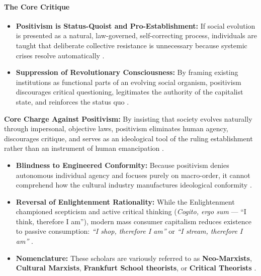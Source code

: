 \paragraph{The Core Critique}
\begin{itemize}
    \item \textbf{Positivism is Status-Quoist and Pro-Establishment:} If social evolution is presented as a natural, law-governed, self-correcting process, individuals are taught that deliberate collective resistance is unnecessary because systemic crises resolve automatically .
    \item \textbf{Suppression of Revolutionary Consciousness:} By framing existing institutions as functional parts of an evolving social organism, positivism discourages critical questioning, legitimates the authority of the capitalist state, and reinforces the status quo .
\end{itemize}

\begin{CriticalPoint}
\textbf{Core Charge Against Positivism:} By insisting that society evolves naturally through impersonal, objective laws, positivism eliminates human agency, discourages critique, and serves as an ideological tool of the ruling establishment rather than an instrument of human emancipation .
\end{CriticalPoint}

\begin{itemize}
    \item \textbf{Blindness to Engineered Conformity:} Because positivism denies autonomous individual agency and focuses purely on macro-order, it cannot comprehend how the cultural industry manufactures ideological conformity .
    \item \textbf{Reversal of Enlightenment Rationality:} While the Enlightenment championed scepticism and active critical thinking (\textit{Cogito, ergo sum} --- ``I think, therefore I am''), modern mass consumer capitalism reduces existence to passive consumption: \textit{``I shop, therefore I am''} or \textit{``I stream, therefore I am''} .
    \item \textbf{Nomenclature:} These scholars are variously referred to as \textbf{Neo-Marxists}, \textbf{Cultural Marxists}, \textbf{Frankfurt School theorists}, or \textbf{Critical Theorists} .
\end{itemize}

